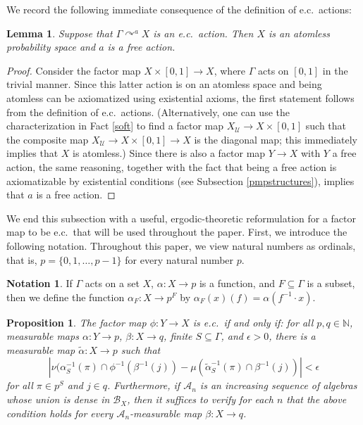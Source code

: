\documentclass[12pt]{amsart}
\newtheorem{lem}[thm]{Lemma}
\newtheorem{prop}[thm]{Proposition}
\theoremstyle{definition}
\newtheorem{notation}[thm]{Notation}
\def\bb{\mathbb}
\def\bb{\mathbb}
\def\cal{\mathcal}
\def\u{\mathsf 1}
\def \u{\mathcal U}
\newcommand{\acts}{\curvearrowright}
\begin{document}
We record the following immediate consequence of the definition of e.c.\ actions:

\begin{lem}\label{ecfree}
Suppose that $\Gamma\acts^a X$ is an e.c.\ action.  Then $X$ is an atomless probability space and $a$ is a free action.
\end{lem}

\begin{proof}
Consider the factor map $X\times [0,1]\to X$, where $\Gamma$ acts on $[0,1]$ in the trivial manner.  Since this latter action is on an atomless space and being atomless can be axiomatized using existential axioms, the first statement follows from the definition of e.c.\ actions.  (Alternatively, one can use the characterization in Fact \ref{soft} to find a factor map $X_\u\to X\times [0,1]$ such that the composite map $X_\u \to X\times [0,1]\to X$ is the diagonal map; this immediately implies that $X$ is atomless.)  Since there is also a factor map $Y\to X$ with $Y$ a free action, the same reasoning, together with the fact that being a free action is axiomatizable by existential conditions (see Subsection \ref{pmpstructures}), implies that $a$ is a free action.
\end{proof}

We end this subsection with a useful, ergodic-theoretic reformulation for a factor map to be e.c.\ that will be used throughout the paper.  First, we introduce the following notation.  Throughout this paper, we view natural numbers as ordinals, that is, $p=\{0,1,\ldots,p-1\}$ for every natural number $p$.

\begin{notation}
If $\Gamma$ acts on a set $X$, $\alpha : X \rightarrow p$ is a function, and $F\subseteq \Gamma$ is a subset, then we define the function $\alpha_F : X \rightarrow p^F$ by $\alpha_F(x)(f) = \alpha(f^{-1} \cdot x)$. 
\end{notation}

\begin{prop}\label{criterion}
The factor map $\phi:Y\to X$ is e.c.\ if and only if:  for all $p,q\in \bb N$, measurable maps $\alpha:Y\to p$, $\beta:X\to q$, finite $S\subseteq \Gamma$, and $\epsilon>0$, there is a measurable map $\tilde{\alpha}:X\to p$ such that
$$\left|\nu(\alpha_S^{-1}(\pi)\cap \phi^{-1}(\beta^{-1}(j))-\mu(\tilde{\alpha}_S^{-1}(\pi)\cap \beta^{-1}(j))\right|<\epsilon$$ for all $\pi\in p^S$ and $j\in q$. Furthermore, if $\cal A_n$ is an increasing sequence of algebras whose union is dense in $\cal B_X$, then it suffices to verify for each $n$ that the above condition holds for every $\cal A_n$-measurable map $\beta : X \rightarrow q$.
\end{prop}
\end{document}
